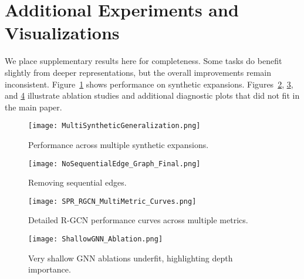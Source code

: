 \documentclass{article}
\begin{document}
\clearpage



\appendix
\section{Additional Experiments and Visualizations}
We place supplementary results here for completeness. Some tasks do benefit slightly from deeper representations, but the overall improvements remain inconsistent. Figure~\ref{fig:multi_synthetic} shows performance on synthetic expansions. Figures~\ref{fig:no_seq_edge}, \ref{fig:multi_metric}, and \ref{fig:shallow_ablation} illustrate ablation studies and additional diagnostic plots that did not fit in the main paper.

\begin{figure}[h]
\centering
\texttt{[image: MultiSyntheticGeneralization.png]}
\caption{Performance across multiple synthetic expansions.}
\label{fig:multi_synthetic}
\end{figure}

\begin{figure}[h]
\centering
\texttt{[image: NoSequentialEdge\_Graph\_Final.png]}
\caption{Removing sequential edges.}
\label{fig:no_seq_edge}
\end{figure}

\begin{figure}[h]
\centering
\texttt{[image: SPR\_RGCN\_MultiMetric\_Curves.png]}
\caption{Detailed R-GCN performance curves across multiple metrics.}
\label{fig:multi_metric}
\end{figure}

\begin{figure}[h]
\centering
\texttt{[image: ShallowGNN\_Ablation.png]}
\caption{Very shallow GNN ablations underfit, highlighting depth importance.}
\label{fig:shallow_ablation}
\end{figure}
\end{document}
